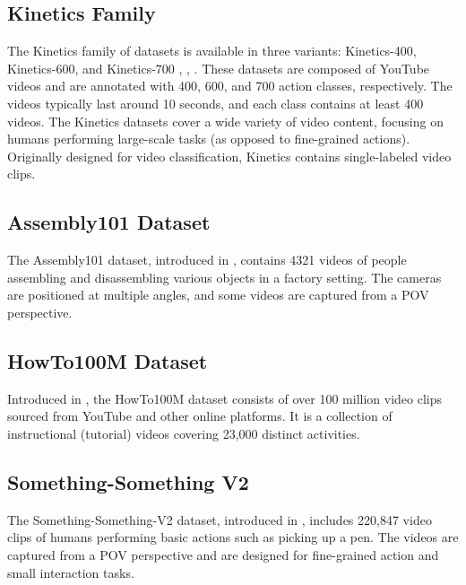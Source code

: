 \subsection*{Kinetics Family}
The Kinetics family of datasets is available in three variants: Kinetics-400, Kinetics-600, and Kinetics-700 \cite{kinetics-400-dataset}, \cite{kinetics-600-dataset}, \cite{kinetics-700-dataset}. These datasets are composed of YouTube videos and are annotated with 400, 600, and 700 action classes, respectively. The videos typically last around 10 seconds, and each class contains at least 400 videos. The Kinetics datasets cover a wide variety of video content, focusing on humans performing large-scale tasks (as opposed to fine-grained actions). Originally designed for video classification, Kinetics contains single-labeled video clips.

\subsection*{Assembly101 Dataset}
The Assembly101 dataset, introduced in \cite{assembly101-dataset}, contains 4321 videos of people assembling and disassembling various objects in a factory setting. The cameras are positioned at multiple angles, and some videos are captured from a POV perspective.

\subsection*{HowTo100M Dataset}
Introduced in \cite{howto100m-dataset}, the HowTo100M dataset consists of over 100 million video clips sourced from YouTube and other online platforms. It is a collection of instructional (tutorial) videos covering 23,000 distinct activities.

\subsection*{Something-Something V2}
The Something-Something-V2 dataset, introduced in \cite{something-something-dataset}, includes 220,847 video clips of humans performing basic actions such as picking up a pen. The videos are captured from a POV perspective and are designed for fine-grained action and small interaction tasks.